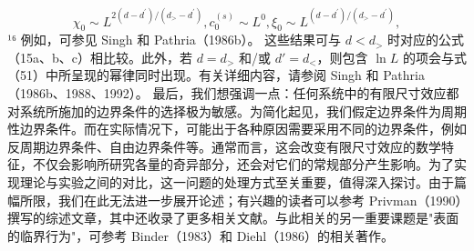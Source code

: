 \begin{equation}\tag{14.4.106}\label{eq:14.4.106}
\chi _ { 0 } \sim L ^{2 ( d - d ^ { \prime} ) / ( d _ { > } - d ^{\prime} ) } ,  c _ { 0 } ^{( s )} \sim L ^{0} ,  \xi _ { 0 } \sim L ^{( d - d ^ { \prime} ) / ( d _ { > } - d ^{\prime} ) } ,
\end{equation}
¹⁶ 例如，可参见 Singh 和 Pathria（1986b）。
这些结果可与 \(d < d_{>}\) 时对应的公式（15a、b、c）相比较。此外，若 \(d = d_{>}\) 和/或 \(d' = d_{<}\)，则包含 \(\ln L\) 的项会与式（51）中所呈现的幂律同时出现。有关详细内容，请参阅 Singh 和 Pathria（1986b、1988、1992）。
最后，我们想强调一点：任何系统中的有限尺寸效应都对系统所施加的边界条件的选择极为敏感。为简化起见，我们假定边界条件为周期性边界条件。而在实际情况下，可能出于各种原因需要采用不同的边界条件，例如反周期边界条件、自由边界条件等。通常而言，这会改变有限尺寸效应的数学特征，不仅会影响所研究各量的奇异部分，还会对它们的常规部分产生影响。为了实现理论与实验之间的对比，这一问题的处理方式至关重要，值得深入探讨。由于篇幅所限，我们在此无法进一步展开论述；有兴趣的读者可以参考 Privman（1990）撰写的综述文章，其中还收录了更多相关文献。与此相关的另一重要课题是"表面的临界行为"，可参考 Binder（1983）和 Diehl（1986）的相关著作。
